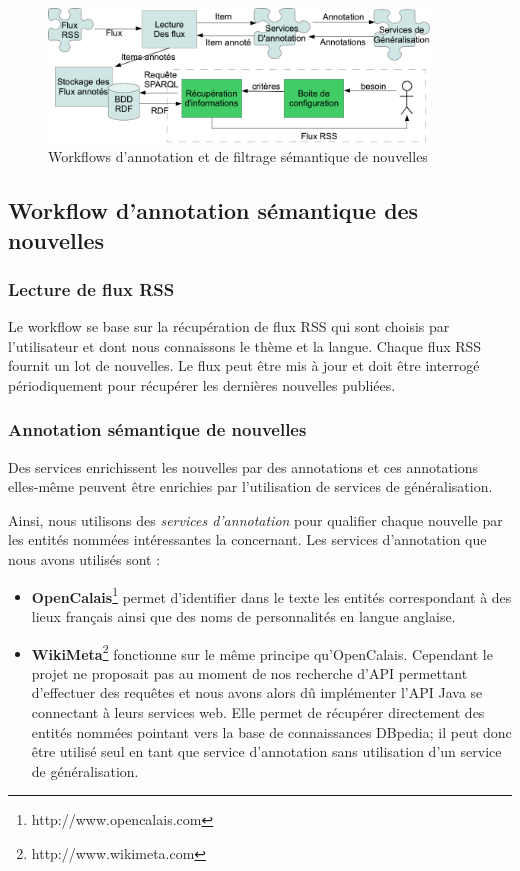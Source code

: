 \documentclass[]{easychair}
\begin{document}
\begin{figure}[htb!]
	\begin{centering}
	\includegraphics[width=0.9\textwidth]{diagramme-Archi.png}
	\caption{Workflows d'annotation et de filtrage sémantique de nouvelles}
	\label{fig:WF}
	\end{centering}
\end{figure}

\subsection{Workflow d'annotation sémantique des nouvelles}

\subsubsection{Lecture de flux RSS}
Le workflow se base sur la récupération de flux RSS qui sont choisis par l'utilisateur et dont nous connaissons le thème et la langue. Chaque flux RSS fournit un lot de nouvelles. Le flux peut être mis à jour et doit être interrogé périodiquement pour récupérer les dernières nouvelles publiées.

\subsubsection{Annotation sémantique de nouvelles}
Des services enrichissent les nouvelles par des annotations et ces annotations elles-même peuvent être enrichies par l'utilisation de services de généralisation. 

Ainsi, nous utilisons des \textit{services d'annotation} pour qualifier chaque nouvelle par les entités nommées intéressantes la concernant. Les services d'annotation que nous avons utilisés sont : 
\begin{itemize}
	\item \textbf{OpenCalais}\footnote{http://www.opencalais.com} permet d'identifier dans le texte les entités correspondant à des lieux français ainsi que des noms de personnalités en langue anglaise. 
  \item \textbf{WikiMeta}\footnote{http://www.wikimeta.com} fonctionne sur le même principe qu'OpenCalais. Cependant le projet ne proposait pas au moment de nos recherche d'API permettant d'effectuer des requêtes et nous avons alors dû implémenter l'API Java se connectant à leurs services web. Elle permet de récupérer directement des entités nommées pointant vers la base de connaissances DBpedia; il peut donc être utilisé seul en tant que service d'annotation sans utilisation d'un service de généralisation.
\end{itemize}
\end{document}
